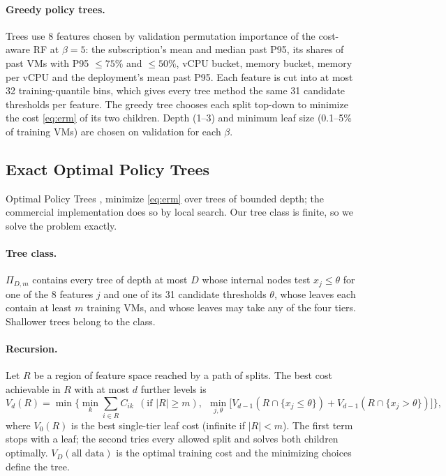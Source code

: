 \documentclass[10pt]{article}
\begin{document}
\paragraph{Greedy policy trees.} Trees use 8 features chosen by validation permutation importance of the cost-aware RF at $\beta=5$: the subscription's mean and median past P95, its shares of past VMs with P95 $\le75\%$ and $\le50\%$, vCPU bucket, memory bucket, memory per vCPU and the deployment's mean past P95. Each feature is cut into at most 32 training-quantile bins, which gives every tree method the same 31 candidate thresholds per feature. The greedy tree chooses each split top-down to minimize the cost \eqref{eq:erm} of its two children. Depth (1--3) and minimum leaf size (0.1--5\% of training VMs) are chosen on validation for each $\beta$.

\subsection{Exact Optimal Policy Trees}
\label{sec:opt}

Optimal Policy Trees \citep{amram2022opt}, \citep[Ch.~14]{bertsimas2019mlopt} minimize \eqref{eq:erm} over trees of bounded depth; the commercial implementation does so by local search. Our tree class is finite, so we solve the problem exactly.

\paragraph{Tree class.} $\Pi_{D,m}$ contains every tree of depth at most $D$ whose internal nodes test $x_j\le\theta$ for one of the 8 features $j$ and one of its 31 candidate thresholds $\theta$, whose leaves each contain at least $m$ training VMs, and whose leaves may take any of the four tiers. Shallower trees belong to the class.

\paragraph{Recursion.} Let $R$ be a region of feature space reached by a path of splits. The best cost achievable in $R$ with at most $d$ further levels is
\begin{equation}
V_d(R)=\min\Big\{\textstyle\min_k \sum_{i\in R}C_{ik}\ \ (\text{if }|R|\ge m),\ \ \min_{j,\theta}\big[V_{d-1}(R\cap\{x_j\le\theta\})+V_{d-1}(R\cap\{x_j>\theta\})\big]\Big\},
\label{eq:dp}
\end{equation}
where $V_0(R)$ is the best single-tier leaf cost (infinite if $|R|<m$). The first term stops with a leaf; the second tries every allowed split and solves both children optimally. $V_D(\text{all data})$ is the optimal training cost and the minimizing choices define the tree.
\end{document}
